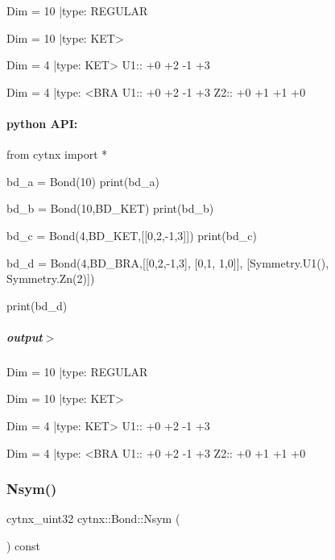\begin{DoxyVerbInclude}
Dim = 10 |type: REGULAR 

Dim = 10 |type: KET>     

Dim = 4 |type: KET>     
 U1::  +0 +2 -1 +3

Dim = 4 |type: <BRA     
 U1::  +0 +2 -1 +3
 Z2::  +0 +1 +1 +0

\end{DoxyVerbInclude}
 \paragraph*{python A\+PI\+:}


\begin{DoxyCodeInclude}
\textcolor{keyword}{from} cytnx \textcolor{keyword}{import} *

bd\_a = Bond(10)
print(bd\_a)

bd\_b = Bond(10,BD\_KET)
print(bd\_b)

bd\_c = Bond(4,BD\_KET,[[0,2,-1,3]])
print(bd\_c)

bd\_d = Bond(4,BD\_BRA,[[0,2,-1,3],
                      [0,1, 1,0]],
                     [Symmetry.U1(),
                      Symmetry.Zn(2)])

print(bd\_d)

    
\end{DoxyCodeInclude}
 \subparagraph*{output$>$}


\begin{DoxyVerbInclude}
Dim = 10 |type: REGULAR 

Dim = 10 |type: KET>     

Dim = 4 |type: KET>     
 U1::  +0 +2 -1 +3

Dim = 4 |type: <BRA     
 U1::  +0 +2 -1 +3
 Z2::  +0 +1 +1 +0





\end{DoxyVerbInclude}
 \mbox{\label{classcytnx_1_1Bond_acd46a218add6a88c1cc9035b06adb7b6}} 
\subsubsection{\texorpdfstring{Nsym()}{Nsym()}}
{\footnotesize\ttfamily cytnx\+\_\+uint32 cytnx\+::\+Bond\+::\+Nsym (\begin{DoxyParamCaption}{ }\end{DoxyParamCaption}) const\hspace{0.3cm}{\ttfamily [inline]}}



